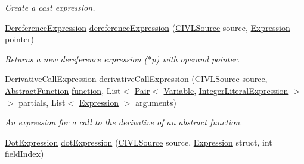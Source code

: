 \begin{DoxyCompactItemize}
\begin{DoxyCompactList}\small\item\em Create a cast expression. \end{DoxyCompactList}\item 
\hyperlink{interfaceedu_1_1udel_1_1cis_1_1vsl_1_1civl_1_1model_1_1IF_1_1expression_1_1DereferenceExpression}{Dereference\+Expression} \hyperlink{classedu_1_1udel_1_1cis_1_1vsl_1_1civl_1_1model_1_1common_1_1CommonModelFactory_a446752077dddf68acdf26725dbb44569}{dereference\+Expression} (\hyperlink{interfaceedu_1_1udel_1_1cis_1_1vsl_1_1civl_1_1model_1_1IF_1_1CIVLSource}{C\+I\+V\+L\+Source} source, \hyperlink{interfaceedu_1_1udel_1_1cis_1_1vsl_1_1civl_1_1model_1_1IF_1_1expression_1_1Expression}{Expression} pointer)
\begin{DoxyCompactList}\small\item\em Returns a new dereference expression ($\ast$p) with operand pointer. \end{DoxyCompactList}\item 
\hyperlink{interfaceedu_1_1udel_1_1cis_1_1vsl_1_1civl_1_1model_1_1IF_1_1expression_1_1DerivativeCallExpression}{Derivative\+Call\+Expression} \hyperlink{classedu_1_1udel_1_1cis_1_1vsl_1_1civl_1_1model_1_1common_1_1CommonModelFactory_a0451ade12789cbf55cc2c451c242a582}{derivative\+Call\+Expression} (\hyperlink{interfaceedu_1_1udel_1_1cis_1_1vsl_1_1civl_1_1model_1_1IF_1_1CIVLSource}{C\+I\+V\+L\+Source} source, \hyperlink{interfaceedu_1_1udel_1_1cis_1_1vsl_1_1civl_1_1model_1_1IF_1_1AbstractFunction}{Abstract\+Function} \hyperlink{classedu_1_1udel_1_1cis_1_1vsl_1_1civl_1_1model_1_1common_1_1CommonModelFactory_a8a7968569d8f0b05aa7ed59dfa5368c7}{function}, List$<$ \hyperlink{classedu_1_1udel_1_1cis_1_1vsl_1_1civl_1_1util_1_1IF_1_1Pair}{Pair}$<$ \hyperlink{interfaceedu_1_1udel_1_1cis_1_1vsl_1_1civl_1_1model_1_1IF_1_1variable_1_1Variable}{Variable}, \hyperlink{interfaceedu_1_1udel_1_1cis_1_1vsl_1_1civl_1_1model_1_1IF_1_1expression_1_1IntegerLiteralExpression}{Integer\+Literal\+Expression} $>$$>$ partials, List$<$ \hyperlink{interfaceedu_1_1udel_1_1cis_1_1vsl_1_1civl_1_1model_1_1IF_1_1expression_1_1Expression}{Expression} $>$ arguments)
\begin{DoxyCompactList}\small\item\em An expression for a call to the derivative of an abstract function. \end{DoxyCompactList}\item 
\hyperlink{interfaceedu_1_1udel_1_1cis_1_1vsl_1_1civl_1_1model_1_1IF_1_1expression_1_1DotExpression}{Dot\+Expression} \hyperlink{classedu_1_1udel_1_1cis_1_1vsl_1_1civl_1_1model_1_1common_1_1CommonModelFactory_a7dd2dcd0a412d5b58aab98b3f086e435}{dot\+Expression} (\hyperlink{interfaceedu_1_1udel_1_1cis_1_1vsl_1_1civl_1_1model_1_1IF_1_1CIVLSource}{C\+I\+V\+L\+Source} source, \hyperlink{interfaceedu_1_1udel_1_1cis_1_1vsl_1_1civl_1_1model_1_1IF_1_1expression_1_1Expression}{Expression} struct, int field\+Index)
$$
\end{DoxyCompactItemize}
